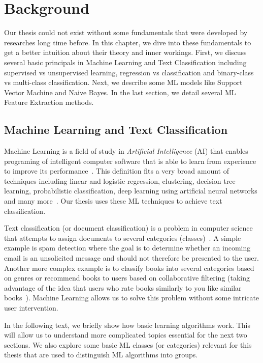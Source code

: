 \chapter{Background}

Our thesis could not exist without some fundamentals that were developed by researches long time before. In this chapter, we dive into these fundamentals to get a better intuition about their theory and inner workings. First, we discuss several basic principals in Machine Learning and Text Classification including supervised vs unsupervised learning, regression vs classification and binary-class vs multi-class classification. Next, we describe some ML models like Support Vector Machine and Naive Bayes. In the last section, we detail several ML Feature Extraction methods.

\section{Machine Learning and Text Classification}

Machine Learning is a field of study in \textit{Artificial Intelligence} (AI) that enables programing of intelligent computer software that is able to learn from experience to improve its performance~\cite{Samuel1959}. This definition fits a very broad amount of techniques including linear and logistic regression, clustering, decision tree learning, probabilistic classification, deep learning using artificial neural networks and many more~\cite{bishop2006pattern}. Our thesis uses these ML techniques to achieve text classification.

Text classification (or document classification) is a problem in computer science that attempts to assign documents to several categories (classes)~\cite{Anvik2006}. A simple example is spam detection where the goal is to determine whether an incoming email is an unsolicited message and should not therefore be presented to the user. Another more complex example is to classify books into several categories based on genres or recommend books to users based on collaborative filtering (taking advantage of the idea that users who rate books similarly to you like similar books~\cite{linden2003amazon}). Machine Learning allows us to solve this problem without some intricate user intervention.

In the following text, we briefly show how basic learning algorithms work. This will allow us to understand more complicated topics essential for the next two sections. We also explore some basic ML classes (or categories) relevant for this thesis that are used to distinguish ML algorithms into groups.

